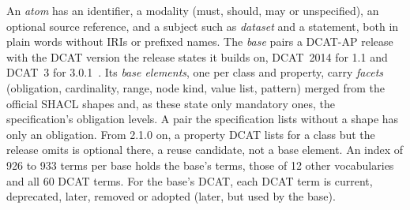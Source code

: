 An \emph{atom} has an identifier, a modality (must, should, may or unspecified), an optional source reference, %
and a subject such as \emph{dataset} and a statement, both in plain words without \acp{IRI} or prefixed names. %
The \emph{base} pairs a \acs{DCAT-AP} release with the \acs{DCAT} version the release states it builds on, %
DCAT~2014 for 1.1 and DCAT~3 for 3.0.1~\cite{dcatap11,semicdcatap301}.  %
Its \emph{base elements}, one per class and property, carry \emph{facets} (obligation, cardinality, range, node %
kind, value list, pattern) merged from the official \ac{SHACL} shapes and, as these state only mandatory ones, %
the specification's obligation levels. A pair the specification lists without a shape has only an obligation. %
From 2.1.0 on, a property \acs{DCAT} lists for a class but the release omits is optional there, a reuse %
candidate, not a base element.  %
An index of 926 to 933 terms per base holds the base's terms, those of 12 other vocabularies and all 60 %
\acs{DCAT} terms. For the base's \acs{DCAT}, each \acs{DCAT} term is current, deprecated, later, removed or %
adopted (later, but used by the base).

